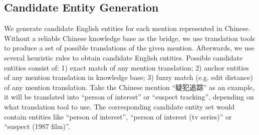 \subsection{Candidate Entity Generation}
\label{sec:candgen}

We generate candidate English entities for each mention represented in Chinese.
Without a reliable Chinese knowledge base as the bridge,
we use translation tools to produce a set of possible translations of the given mention.
Afterwards, we use several heuristic rules to obtain candidate English entities.
Possible candidate entities consist of:
1) exact match of any mention translation;
2) anchor entities of any mention translation in knowledge base;
3) fuzzy match (e.g. edit distance) of any mention translation. 
Take the Chinese mention ``疑犯追踪'' as an example,
it will be translated  into ``person of interest'' or  ``suspect tracking'',
depending on what translation tool to use.
The corresponding candidate entity set would contain entities like ``person of interest'', 
``person of interest (tv series)'' or ``suspect (1987 film)''.
